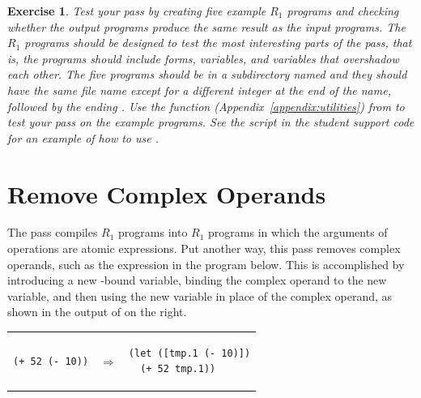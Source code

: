 \documentclass[11pt]{book}
\newtheorem{exercise}[theorem]{Exercise}
\begin{document}
\begin{exercise}
\normalfont %

Test your  pass by creating five example $R_1$ programs
and checking whether the output programs produce the same result as
the input programs. The $R_1$ programs should be designed to test the
most interesting parts of the  pass, that is, the
programs should include  forms, variables, and variables
that overshadow each other.  The five programs should be in a
subdirectory named  and they should have the same file name
except for a different integer at the end of the name, followed by the
ending .  Use the  function
(Appendix~\ref{appendix:utilities}) from  to test
your  pass on the example programs.  See the
 script in the student support code for an example
of how to use .

\end{exercise}

\section{Remove Complex Operands}
\label{sec:remove-complex-opera-R1}

The  pass compiles $R_1$ programs into
$R_1$ programs in which the arguments of operations are atomic
expressions.  Put another way, this pass removes complex
operands, such as the expression 
in the program below. This is accomplished by introducing a new
-bound variable, binding the complex operand to the new
variable, and then using the new variable in place of the complex
operand, as shown in the output of  on the
right.\\
\begin{tabular}{lll}
\begin{minipage}{0.4\textwidth}
\begin{lstlisting}
(+ 52 (- 10))
\end{lstlisting}
\end{minipage}
&
$\Rightarrow$
&
\begin{minipage}{0.4\textwidth}
\begin{lstlisting}
(let ([tmp.1 (- 10)])
  (+ 52 tmp.1))
\end{lstlisting}
\end{minipage}
\end{tabular}
\end{document}
